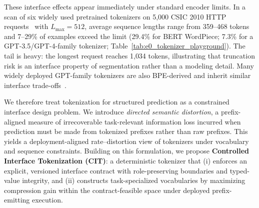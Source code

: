 These interface effects appear immediately under standard encoder limits.
In a scan of six widely used pretrained tokenizers on 5{,}000 CSIC 2010 HTTP requests~\cite{torrano2010csic} with $L_{\max}{=}512$, average sequence lengths range from 359--468 tokens and 7--29\% of examples exceed the limit (29.4\% for BERT WordPiece; 7.3\% for a GPT-3.5/GPT-4-family tokenizer; Table~\ref{tab:e0_tokenizer_playground}).
The tail is heavy: the longest request reaches 1{,}034 tokens, illustrating that truncation risk is an interface property of segmentation rather than a modeling detail.
Many widely deployed GPT-family tokenizers are also BPE-derived and inherit similar interface trade-offs~\cite{radford2019language,brown2020language}.


We therefore treat tokenization for structured prediction as a constrained interface design problem.
We introduce \emph{directed semantic distortion}, a prefix-aligned measure of irrecoverable task-relevant information loss incurred when prediction must be made from tokenized prefixes rather than raw prefixes.
This yields a deployment-aligned rate--distortion view of tokenizers under vocabulary and sequence constraints.
Building on this formulation, we propose \textbf{Controlled Interface Tokenization (CIT)}: a deterministic tokenizer that (i) enforces an explicit, versioned interface contract with role-preserving boundaries and typed-value integrity, and (ii) constructs task-specialized vocabularies by maximizing compression gain within the contract-feasible space under deployed prefix-emitting execution.

